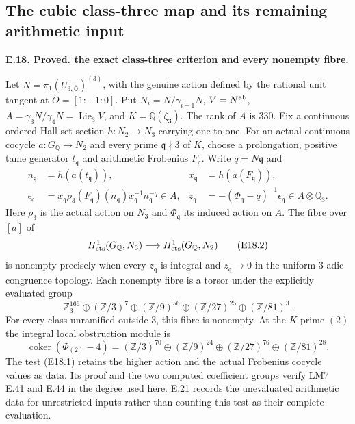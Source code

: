 \documentclass[11pt,oneside]{article}
\makeatletter
\DeclareMathOperator{\coker}{coker}
\newcounter{statementanchor}
\newenvironment{statement}[3]{%
 \refstepcounter{statementanchor}\def\@currentlabel{#1}%
 \par\addvspace{9pt}\noindent
 \textbf{#1. #2. #3.}\par\nobreak\noindent\ignorespaces
}{\par\addvspace{5pt}}
\makeatother
\begin{document}
\subsection{The cubic class-three map and its remaining arithmetic input}

\begin{statement}{E.18}{Proved}{the exact class-three criterion and every nonempty fibre}
\label{st:E.18}
\label{E-class-three-criterion}
Let $N=\pi_1(U_{3,\overline{\mathbb Q}})^{(3)}$, with
the genuine action defined by the rational unit tangent
at $O=[1:-1:0]$. Put $N_i=N/\gamma_{i+1}N$,
$V=N^{\rm ab}$, $A=\gamma_3N/\gamma_4N=\operatorname{Lie}_3V$,
and $K=\mathbb Q(\zeta_3)$. The rank of $A$ is $330$.
Fix a continuous ordered-Hall set section $h:N_2\to N_3$
carrying one to one. For an actual continuous cocycle
$a:G_{\mathbb Q}\to N_2$ and every prime
$\mathfrak q\nmid3$ of $K$, choose a prolongation,
positive tame generator $t_{\mathfrak q}$ and arithmetic
Frobenius $F_{\mathfrak q}$. Write $q=N\mathfrak q$ and
\[
 \begin{aligned}
 n_{\mathfrak q}&=h(a(t_{\mathfrak q})),&
 x_{\mathfrak q}&=h(a(F_{\mathfrak q})),\\
 \epsilon_{\mathfrak q}
 &=x_{\mathfrak q}\rho_3(F_{\mathfrak q})(n_{\mathfrak q})
       x_{\mathfrak q}^{-1}n_{\mathfrak q}^{-q}\in A,&
 z_{\mathfrak q}
 &=-(\Phi_{\mathfrak q}-q)^{-1}\epsilon_{\mathfrak q}
       \in A\otimes\mathbb Q_3 .
 \end{aligned}
 \tag{E18.1}
\]
Here $\rho_3$ is the actual action on $N_3$ and
$\Phi_{\mathfrak q}$ its induced action on $A$.
The fibre over $[a]$ of
\[
 H^1_{\rm cts}(G_{\mathbb Q},N_3)
       \longrightarrow H^1_{\rm cts}(G_{\mathbb Q},N_2)
 \tag{E18.2}
\]
is nonempty precisely when every $z_{\mathfrak q}$ is
integral and $z_{\mathfrak q}\to0$ in the uniform
$3$-adic congruence topology. Each nonempty fibre is
a torsor under the explicitly evaluated group
\[
 \mathbb Z_3^{166}\oplus(\mathbb Z/3)^7
   \oplus(\mathbb Z/9)^{56}\oplus(\mathbb Z/27)^{25}
   \oplus(\mathbb Z/81)^3 .
 \tag{E18.3}
\]
For every class unramified outside $3$, this fibre
is nonempty. At the $K$-prime $(2)$ the integral
local obstruction module is
\[
 \coker(\Phi_{(2)}-4)=
 (\mathbb Z/3)^{70}\oplus(\mathbb Z/9)^{24}
 \oplus(\mathbb Z/27)^{76}\oplus(\mathbb Z/81)^{28}.
 \tag{E18.4}
\]
The test (E18.1) retains the higher action and the
actual Frobenius cocycle values as data. Its proof
and the two computed coefficient groups verify LM7
E.41 and E.44 in the degree used here. E.21 records
the unevaluated arithmetic data for unrestricted
inputs rather than counting this test as their
complete evaluation.
\end{statement}
\end{document}
